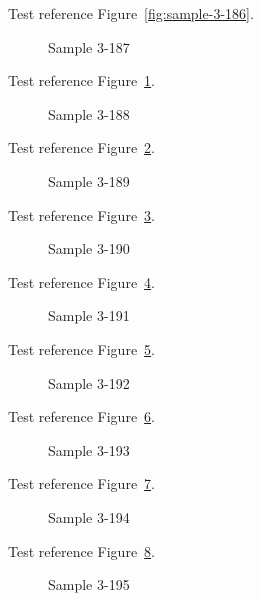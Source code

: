Test reference Figure~\ref{fig:sample-3-186}.

\begin{figure}[tbhp]
\caption{Sample 3-187}
\label{fig:sample-3-187}
\end{figure}

Test reference Figure~\ref{fig:sample-3-187}.

\begin{figure}[tbhp]
\caption{Sample 3-188}
\label{fig:sample-3-188}
\end{figure}

Test reference Figure~\ref{fig:sample-3-188}.

\begin{figure}[tbhp]
\caption{Sample 3-189}
\label{fig:sample-3-189}
\end{figure}

Test reference Figure~\ref{fig:sample-3-189}.

\begin{figure}[tbhp]
\caption{Sample 3-190}
\label{fig:sample-3-190}
\end{figure}

Test reference Figure~\ref{fig:sample-3-190}.

\begin{figure}[tbhp]
\caption{Sample 3-191}
\label{fig:sample-3-191}
\end{figure}

Test reference Figure~\ref{fig:sample-3-191}.

\begin{figure}[tbhp]
\caption{Sample 3-192}
\label{fig:sample-3-192}
\end{figure}

Test reference Figure~\ref{fig:sample-3-192}.

\begin{figure}[tbhp]
\caption{Sample 3-193}
\label{fig:sample-3-193}
\end{figure}

Test reference Figure~\ref{fig:sample-3-193}.

\begin{figure}[tbhp]
\caption{Sample 3-194}
\label{fig:sample-3-194}
\end{figure}

Test reference Figure~\ref{fig:sample-3-194}.

\begin{figure}[tbhp]
\caption{Sample 3-195}
\label{fig:sample-3-195}
\end{figure}

